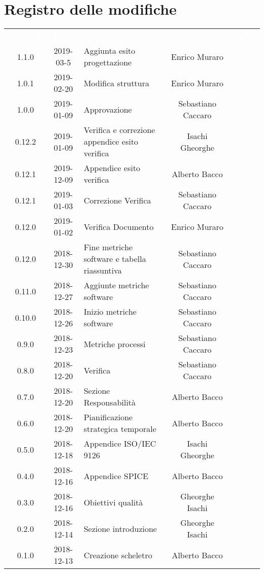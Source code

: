 \section*{Registro delle modifiche}
{
	\renewcommand{\arraystretch}{1.5}
	\centering
	\begin{longtable}{c c C{4cm} c  c }
		\textcolor{white}{\textbf{Versione}} &
		\textcolor{white}{\textbf{Data}} &
		\textcolor{white}{\textbf{Descrizione}} &
		\textcolor{white}{\textbf{Nominativo}} &
		\textcolor{white}{\textbf{Ruolo}}
		\\
		1.1.0 &
		2019-03-5 &
		Aggiunta esito progettazione &
		Enrico Muraro &
		\reda{}
		\\
		1.0.1 &
		2019-02-20 &
		Modifica struttura &
		Enrico Muraro &
		\reda{}
		\\
		1.0.0 &
		2019-01-09 &
		Approvazione &
		Sebastiano Caccaro &
		\Res{}
		\\
		0.12.2 &
		2019-01-09 &
		Verifica e correzione appendice esito verifica &
		Isachi Gheorghe &
		\ver{}
		\\
		0.12.1 &
		2019-12-09 &
		Appendice esito verifica &
		Alberto Bacco &
		\ver{}
		\\
		0.12.1 &
		2019-01-03 &
		Correzione Verifica &
		Sebastiano Caccaro &
		\reda{}
		\\
		0.12.0 &
		2019-01-02 &
		Verifica Documento &
		Enrico Muraro &
		\ver{}
		\\
		0.12.0 &
		2018-12-30 &
		Fine metriche software e tabella riassuntiva &
		Sebastiano Caccaro &
		\reda{}
		\\
		0.11.0 &
		2018-12-27 &
		Aggiunte metriche software  &
		Sebastiano Caccaro &
		\reda{}
		\\
		0.10.0 &
		2018-12-26 &
		Inizio metriche software &
		Sebastiano Caccaro &
		\reda{}
		\\
		0.9.0 &
		2018-12-23 &
		Metriche processi &
		Sebastiano Caccaro &
		\reda{}
		\\
		0.8.0 &
		2018-12-20 &
		Verifica &
		Sebastiano Caccaro &
		\reda{}		
		\\
		0.7.0 &
		2018-12-20 &
		Sezione Responsabilità &
		Alberto Bacco &
		\reda{}
		\\
		0.6.0 &
		2018-12-20 &
		Pianificazione strategica temporale &
		Alberto Bacco &
		\reda{}
		\\
		0.5.0 &
		2018-12-18 &
		Appendice ISO/IEC 9126 &
		Isachi Gheorghe &
		\reda{}
		\\
		0.4.0 &
		2018-12-16 &
		Appendice SPICE &
		Alberto Bacco &
		\reda{}
		\\
		0.3.0 &
		2018-12-16 &
		Obiettivi qualità &
		Gheorghe Isachi &
		\reda{}
		\\
		0.2.0 &
		2018-12-14 &
		Sezione introduzione &
		Gheorghe Isachi&
		\reda{}
		\\
		0.1.0 &
		2018-12-13 &
		Creazione scheletro &
		Alberto Bacco&
		\reda{}
		\\
	\end{longtable}

}